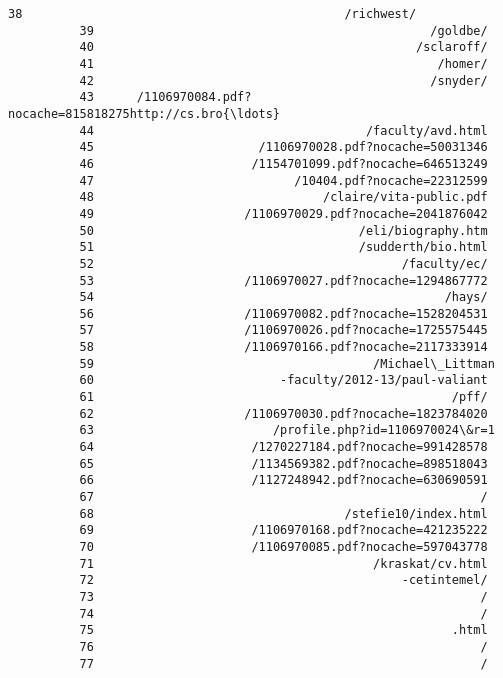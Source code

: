\documentclass[11pt]{article}
\begin{document}
\begin{Verbatim}[commandchars=\\\{\}]
          38                                             /richwest/
          39                                               /goldbe/
          40                                             /sclaroff/
          41                                                /homer/
          42                                               /snyder/
          43      /1106970084.pdf?nocache=815818275http://cs.bro{\ldots}
          44                                      /faculty/avd.html
          45                       /1106970028.pdf?nocache=50031346
          46                      /1154701099.pdf?nocache=646513249
          47                            /10404.pdf?nocache=22312599
          48                                /claire/vita-public.pdf
          49                     /1106970029.pdf?nocache=2041876042
          50                                     /eli/biography.htm
          51                                     /sudderth/bio.html
          52                                           /faculty/ec/
          53                     /1106970027.pdf?nocache=1294867772
          54                                                 /hays/
          56                     /1106970082.pdf?nocache=1528204531
          57                     /1106970026.pdf?nocache=1725575445
          58                     /1106970166.pdf?nocache=2117333914
          59                                       /Michael\_Littman
          60                          -faculty/2012-13/paul-valiant
          61                                                  /pff/
          62                     /1106970030.pdf?nocache=1823784020
          63                         /profile.php?id=1106970024\&r=1
          64                      /1270227184.pdf?nocache=991428578
          65                      /1134569382.pdf?nocache=898518043
          66                      /1127248942.pdf?nocache=630690591
          67                                                      /
          68                                   /stefie10/index.html
          69                      /1106970168.pdf?nocache=421235222
          70                      /1106970085.pdf?nocache=597043778
          71                                       /kraskat/cv.html
          72                                           -cetintemel/
          73                                                      /
          74                                                      /
          75                                                  .html
          76                                                      /
          77                                                      /

\end{Verbatim}
\end{document}
